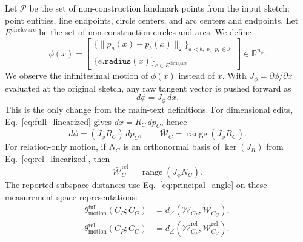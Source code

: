 Let $\mathcal{P}$ be the set of non-construction landmark points from the input sketch: point entities, line endpoints, circle centers, and arc centers and endpoints. Let $E^\mathrm{circle/arc}$ be the set of non-construction circles and arcs. We define
\begin{equation}
    \phi(x)
    =
    \begin{bmatrix}
    \{\lVert p_a(x)-p_b(x)\rVert_2\}_{a<b,\;p_a,p_b\in\mathcal{P}}\\
    \{e.\mathtt{radius}(x)\}_{e\in E^\mathrm{circle/arc}}
    \end{bmatrix}
    \in\mathbb{R}^{n_\phi}.
    \label{eq:appendix_observation_map}
\end{equation}
We observe the infinitesimal motion of $\phi(x)$ instead of $x$. With $J_\phi=\partial\phi/\partial x$ evaluated at the original sketch, any raw tangent vector is pushed forward as
\begin{equation}
    d\phi = J_\phi\,dx.
    \label{eq:appendix_observation_linearization}
\end{equation}
This is the only change from the main-text definitions. For dimensional edits, Eq.~\ref{eq:full_linearized} gives $dx=R_C\,dp_C$, hence
\begin{equation}
    d\phi = (J_\phi R_C)\,dp_C,
    \qquad
    \bar{\mathcal{W}}_C=\operatorname{range}(J_\phi R_C).
    \label{eq:appendix_projected_full_space}
\end{equation}
For relation-only motion, if $N_C$ is an orthonormal basis of $\ker(J_R)$ from Eq.~\ref{eq:rel_linearized}, then
\begin{equation}
    \bar{\mathcal{W}}^\mathrm{rel}_C
    =
    \operatorname{range}(J_\phi N_C).
    \label{eq:appendix_projected_rel_space}
\end{equation}
The reported subspace distances use Eq.~\ref{eq:principal_angle} on these measurement-space representations:
\begin{align}
    \theta_\mathrm{motion}^\mathrm{full}(C_P;C_G)
    &=
    d_\angle(\bar{\mathcal{W}}_{C_P},\bar{\mathcal{W}}_{C_G}),\\
    \theta_\mathrm{motion}^\mathrm{rel}(C_P;C_G)
    &=
    d_\angle(\bar{\mathcal{W}}^\mathrm{rel}_{C_P},
             \bar{\mathcal{W}}^\mathrm{rel}_{C_G}).
    \label{eq:appendix_projected_motion_distances}
\end{align}

